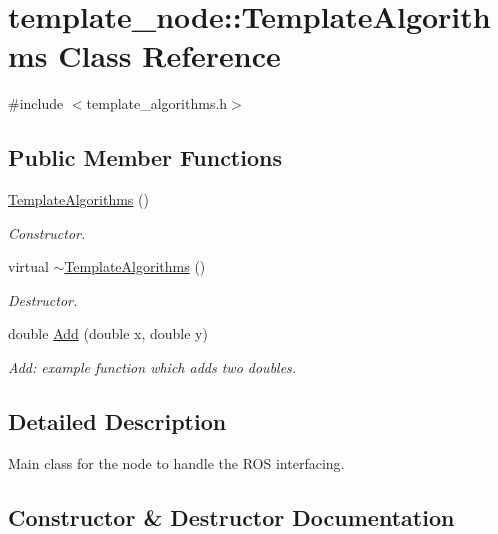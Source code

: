 \hypertarget{classtemplate__node_1_1TemplateAlgorithms}{}\section{template\+\_\+node\+:\+:Template\+Algorithms Class Reference}
\label{classtemplate__node_1_1TemplateAlgorithms}


{\ttfamily \#include $<$template\+\_\+algorithms.\+h$>$}

\subsection*{Public Member Functions}
\begin{DoxyCompactItemize}
\item 
\hyperlink{classtemplate__node_1_1TemplateAlgorithms_a2ad25bcfe53d334ccb0e8a63d2130ba8}{Template\+Algorithms} ()
\begin{DoxyCompactList}\small\item\em Constructor. \end{DoxyCompactList}\item 
virtual \hyperlink{classtemplate__node_1_1TemplateAlgorithms_acbed3c42187d8d716514c4ae0267cdfe}{$\sim$\+Template\+Algorithms} ()
\begin{DoxyCompactList}\small\item\em Destructor. \end{DoxyCompactList}\item 
double \hyperlink{classtemplate__node_1_1TemplateAlgorithms_a9c05db2f35b90b44c7a055ea58d55d42}{Add} (double x, double y)
\begin{DoxyCompactList}\small\item\em Add\+: example function which adds two doubles. \end{DoxyCompactList}\end{DoxyCompactItemize}


\subsection{Detailed Description}
Main class for the node to handle the R\+OS interfacing. 

\subsection{Constructor \& Destructor Documentation}
